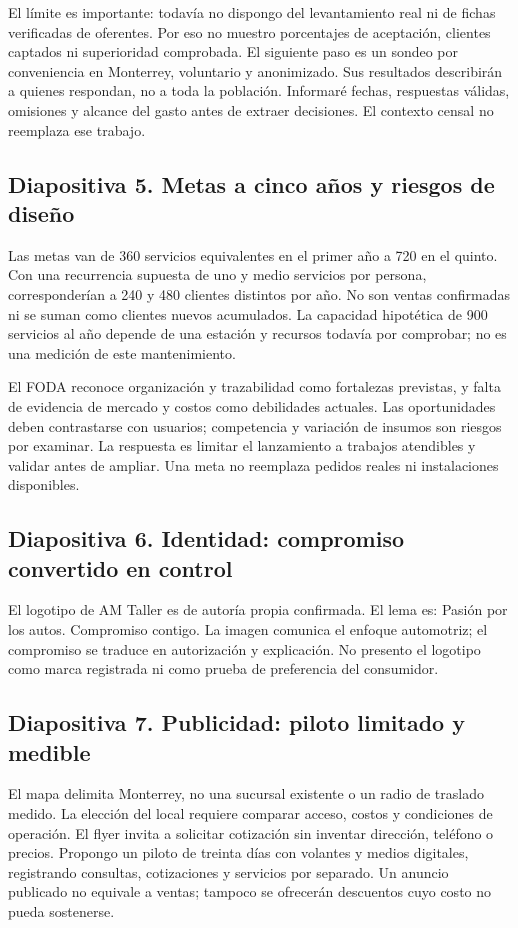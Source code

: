 {El límite es importante: todavía no dispongo del levantamiento real ni de fichas verificadas de oferentes. Por eso no muestro porcentajes de aceptación, clientes captados ni superioridad comprobada. El siguiente paso es un sondeo por conveniencia en Monterrey, voluntario y anonimizado. Sus resultados describirán a quienes respondan, no a toda la población. Informaré fechas, respuestas válidas, omisiones y alcance del gasto antes de extraer decisiones. El contexto censal no reemplaza ese trabajo.

\subsection{Diapositiva 5. Metas a cinco años y riesgos de diseño}
Las metas van de 360 servicios equivalentes en el primer año a 720 en el quinto. Con una recurrencia supuesta de uno y medio servicios por persona, corresponderían a 240 y 480 clientes distintos por año. No son ventas confirmadas ni se suman como clientes nuevos acumulados. La capacidad hipotética de 900 servicios al año depende de una estación y recursos todavía por comprobar; no es una medición de este mantenimiento.

El FODA reconoce organización y trazabilidad como fortalezas previstas, y falta de evidencia de mercado y costos como debilidades actuales. Las oportunidades deben contrastarse con usuarios; competencia y variación de insumos son riesgos por examinar. La respuesta es limitar el lanzamiento a trabajos atendibles y validar antes de ampliar. Una meta no reemplaza pedidos reales ni instalaciones disponibles.

\subsection{Diapositiva 6. Identidad: compromiso convertido en control}
El logotipo de AM Taller es de autoría propia confirmada. El lema es: Pasión por los autos. Compromiso contigo. La imagen comunica el enfoque automotriz; el compromiso se traduce en autorización y explicación. No presento el logotipo como marca registrada ni como prueba de preferencia del consumidor.

\subsection{Diapositiva 7. Publicidad: piloto limitado y medible}
El mapa delimita Monterrey, no una sucursal existente o un radio de traslado medido. La elección del local requiere comparar acceso, costos y condiciones de operación. El flyer invita a solicitar cotización sin inventar dirección, teléfono o precios. Propongo un piloto de treinta días con volantes y medios digitales, registrando consultas, cotizaciones y servicios por separado. Un anuncio publicado no equivale a ventas; tampoco se ofrecerán descuentos cuyo costo no pueda sostenerse.

}
